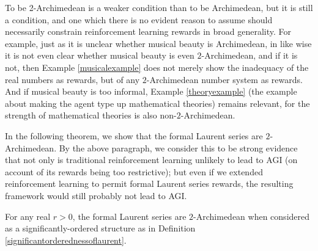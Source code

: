 \documentclass[twoside,11pt]{article}
\begin{document}
To be 2-Archimedean is a weaker condition than to be Archimedean, but it is
still a condition, and one which there is no evident reason to assume should
necessarily constrain reinforcement learning rewards in broad generality.
For example, just as it is unclear whether musical beauty is Archimedean,
in like wise it is not even clear whether musical beauty is even $2$-Archimedean,
and if it is not, then Example \ref{musicalexample} does not merely show the
inadequacy of the real numbers as rewards, but of any $2$-Archimedean number
system as rewards. And if musical beauty is too informal, Example \ref{theoryexample}
(the example about making the agent type up mathematical theories) remains relevant,
for the strength of mathematical theories is also non-$2$-Archimedean.

In the following theorem, we show that the formal Laurent series are $2$-Archimedean.
By the above paragraph, we consider this to be strong evidence that not only is
traditional reinforcement learning unlikely to lead to AGI (on account of its rewards
being too restrictive); but even if we extended reinforcement learning to permit
formal Laurent series rewards, the resulting framework would still probably not lead
to AGI.

\begin{proposition}
\label{tedioustheorem}
For any real $r>0$,
the formal Laurent series are $2$-Archimedean when considered as a
significantly-ordered structure as in Definition \ref{significantorderednessoflaurent}.
\end{proposition}
\end{document}
